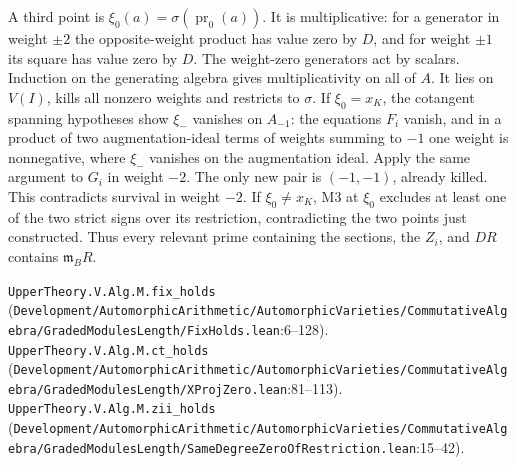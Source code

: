 A third point is $\xi_0(a)=\sigma(\operatorname{pr}_0(a))$. It is multiplicative:
for a generator in weight $\pm2$ the opposite-weight product has value zero by $D$,
and for weight $\pm1$ its square has value zero by $D$. The weight-zero generators
act by scalars. Induction on the generating algebra gives multiplicativity on all of $A$.
It lies on $V(I)$, kills all nonzero weights and restricts to $\sigma$.
If $\xi_0=x_K$, the cotangent spanning hypotheses show $\xi_-$ vanishes on
$A_{-1}$: the equations $F_i$ vanish, and in a product of two augmentation-ideal
terms of weights summing to $-1$ one weight is nonnegative, where $\xi_-$ vanishes
on the augmentation ideal. Apply the same argument to $G_i$ in weight $-2$.
The only new pair is $(-1,-1)$, already killed. This contradicts survival in
weight $-2$. If $\xi_0\ne x_K$, M3 at $\xi_0$ excludes at least one of the
two strict signs over its restriction, contradicting the two points just constructed.
Thus every relevant prime containing the sections, the $Z_i$, and $DR$ contains
$\mathfrak m_BR$.
\par{\footnotesize \nolinkurl{UpperTheory.V.Alg.M.fix_holds} (\nolinkurl{Development/AutomorphicArithmetic/AutomorphicVarieties/CommutativeAlgebra/GradedModulesLength/FixHolds.lean}\allowbreak:6--128). \nolinkurl{UpperTheory.V.Alg.M.ct_holds} (\nolinkurl{Development/AutomorphicArithmetic/AutomorphicVarieties/CommutativeAlgebra/GradedModulesLength/XProjZero.lean}\allowbreak:81--113). \nolinkurl{UpperTheory.V.Alg.M.zii_holds} (\nolinkurl{Development/AutomorphicArithmetic/AutomorphicVarieties/CommutativeAlgebra/GradedModulesLength/SameDegreeZeroOfRestriction.lean}\allowbreak:15--42).\par}

